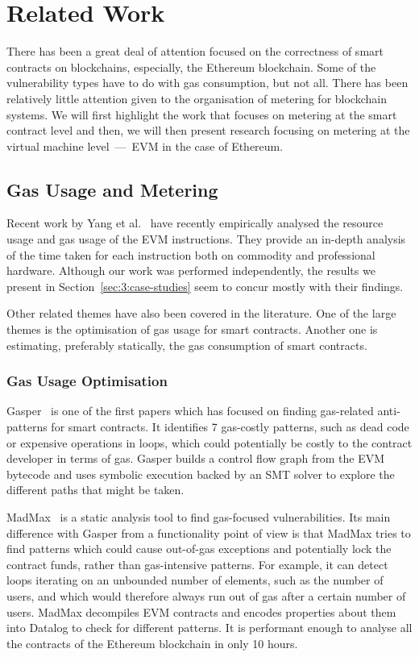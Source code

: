 \section{Related Work}
\label{sec:3:related}

There has been a great deal of attention focused on the correctness of smart contracts on blockchains, especially, the Ethereum blockchain. Some of the vulnerability types have to do with gas consumption, but not all. There has been relatively little attention given to the organisation of metering for blockchain systems. We will first highlight the work that focuses on metering at the smart contract level and then, we will then present research focusing on metering at the virtual machine level~---~EVM in the case of Ethereum.

\subsection{Gas Usage and Metering}
Recent work by Yang et al.~\cite{DBLP:journals/corr/abs-1905-00553} have recently empirically analysed the resource usage and gas usage of the EVM instructions.
They provide an in-depth analysis of the time taken for each instruction both on commodity and professional hardware. Although our work was performed independently, the results we present in Section~\ref{sec:3:case-studies} seem to concur mostly with their findings.

Other related themes have also been covered in the literature. One of the large themes is the optimisation of gas usage for smart contracts. Another one is estimating, preferably statically, the gas consumption of smart contracts.

\subsubsection*{Gas Usage Optimisation}
Gasper~\cite{Chen2017} is one of the first papers which has focused on finding gas-related anti-patterns for smart contracts. It identifies 7 gas-costly patterns, such as dead code or expensive operations in loops, which could potentially be costly to the contract developer in terms of gas. Gasper builds a control flow graph from the EVM bytecode and uses symbolic execution backed by an SMT solver to explore the different paths that might be taken.

MadMax~\cite{Grech2018} is a static analysis tool to find gas-focused vulnerabilities. Its main difference with Gasper from a functionality point of view is that MadMax tries to find patterns which could cause out-of-gas exceptions and potentially lock the contract funds, rather than gas-intensive patterns. For example, it can detect loops iterating on an unbounded number of elements, such as the number of users, and which would therefore always run out of gas after a certain number of users. MadMax decompiles EVM contracts and encodes properties about them into Datalog to check for different patterns. It is performant enough to analyse all the contracts of the Ethereum blockchain in only 10 hours.

